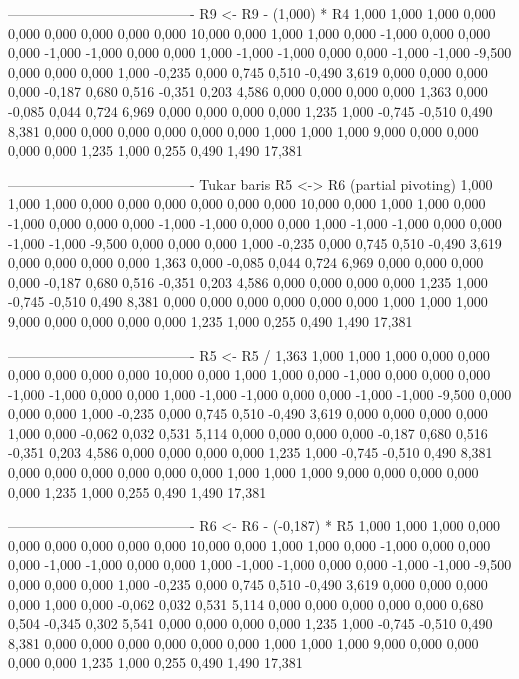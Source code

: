 \documentclass[12pt]{article}
\begin{document}
\begin{enumerate}
\begin{keluaran}
----------------------------------------
R9 <- R9 - (1,000) * R4
1,000   1,000   1,000   0,000   0,000   0,000   0,000   0,000   0,000   10,000
0,000   1,000   1,000   0,000   -1,000  0,000   0,000   0,000   -1,000  -1,000
0,000   0,000   1,000   -1,000  -1,000  0,000   0,000   -1,000  -1,000  -9,500
0,000   0,000   0,000   1,000   -0,235  0,000   0,745   0,510   -0,490  3,619
0,000   0,000   0,000   0,000   -0,187  0,680   0,516   -0,351  0,203   4,586
0,000   0,000   0,000   0,000   1,363   0,000   -0,085  0,044   0,724   6,969
0,000   0,000   0,000   0,000   1,235   1,000   -0,745  -0,510  0,490   8,381
0,000   0,000   0,000   0,000   0,000   0,000   1,000   1,000   1,000   9,000
0,000   0,000   0,000   0,000   1,235   1,000   0,255   0,490   1,490   17,381

----------------------------------------
Tukar baris R5 <-> R6 (partial pivoting)
1,000   1,000   1,000   0,000   0,000   0,000   0,000   0,000   0,000   10,000
0,000   1,000   1,000   0,000   -1,000  0,000   0,000   0,000   -1,000  -1,000
0,000   0,000   1,000   -1,000  -1,000  0,000   0,000   -1,000  -1,000  -9,500
0,000   0,000   0,000   1,000   -0,235  0,000   0,745   0,510   -0,490  3,619
0,000   0,000   0,000   0,000   1,363   0,000   -0,085  0,044   0,724   6,969
0,000   0,000   0,000   0,000   -0,187  0,680   0,516   -0,351  0,203   4,586
0,000   0,000   0,000   0,000   1,235   1,000   -0,745  -0,510  0,490   8,381
0,000   0,000   0,000   0,000   0,000   0,000   1,000   1,000   1,000   9,000
0,000   0,000   0,000   0,000   1,235   1,000   0,255   0,490   1,490   17,381

----------------------------------------
R5 <- R5 / 1,363
1,000   1,000   1,000   0,000   0,000   0,000   0,000   0,000   0,000   10,000
0,000   1,000   1,000   0,000   -1,000  0,000   0,000   0,000   -1,000  -1,000
0,000   0,000   1,000   -1,000  -1,000  0,000   0,000   -1,000  -1,000  -9,500
0,000   0,000   0,000   1,000   -0,235  0,000   0,745   0,510   -0,490  3,619
0,000   0,000   0,000   0,000   1,000   0,000   -0,062  0,032   0,531   5,114
0,000   0,000   0,000   0,000   -0,187  0,680   0,516   -0,351  0,203   4,586
0,000   0,000   0,000   0,000   1,235   1,000   -0,745  -0,510  0,490   8,381
0,000   0,000   0,000   0,000   0,000   0,000   1,000   1,000   1,000   9,000
0,000   0,000   0,000   0,000   1,235   1,000   0,255   0,490   1,490   17,381

----------------------------------------
R6 <- R6 - (-0,187) * R5
1,000   1,000   1,000   0,000   0,000   0,000   0,000   0,000   0,000   10,000
0,000   1,000   1,000   0,000   -1,000  0,000   0,000   0,000   -1,000  -1,000
0,000   0,000   1,000   -1,000  -1,000  0,000   0,000   -1,000  -1,000  -9,500
0,000   0,000   0,000   1,000   -0,235  0,000   0,745   0,510   -0,490  3,619
0,000   0,000   0,000   0,000   1,000   0,000   -0,062  0,032   0,531   5,114
0,000   0,000   0,000   0,000   0,000   0,680   0,504   -0,345  0,302   5,541
0,000   0,000   0,000   0,000   1,235   1,000   -0,745  -0,510  0,490   8,381
0,000   0,000   0,000   0,000   0,000   0,000   1,000   1,000   1,000   9,000
0,000   0,000   0,000   0,000   1,235   1,000   0,255   0,490   1,490   17,381


\end{keluaran}
\end{enumerate}
\end{document}
